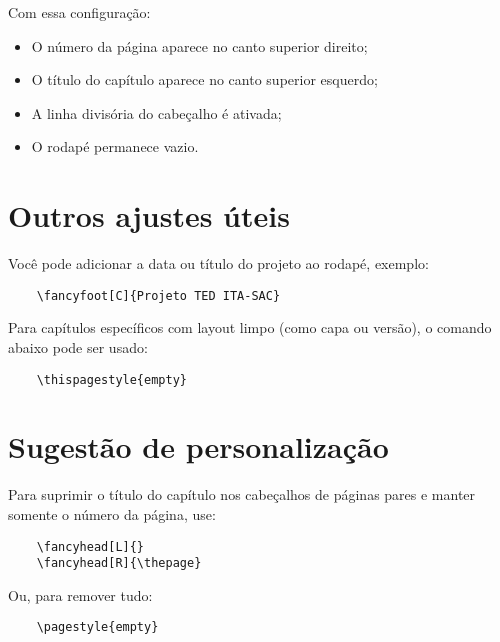 Com essa configuração:

\begin{itemize}
	\item O número da página aparece no canto superior direito;
	\item O título do capítulo aparece no canto superior esquerdo;
	\item A linha divisória do cabeçalho é ativada;
	\item O rodapé permanece vazio.
\end{itemize}

\section{Outros ajustes úteis}

Você pode adicionar a data ou título do projeto ao rodapé, exemplo:

\begin{verbatim}
	\fancyfoot[C]{Projeto TED ITA-SAC}
\end{verbatim}

Para capítulos específicos com layout limpo (como capa ou versão), o comando abaixo pode ser usado:

\begin{verbatim}
	\thispagestyle{empty}
\end{verbatim}

\section{Sugestão de personalização}

Para suprimir o título do capítulo nos cabeçalhos de páginas pares e manter somente o número da página, use:

\begin{verbatim}
	\fancyhead[L]{}
	\fancyhead[R]{\thepage}
\end{verbatim}

Ou, para remover tudo:

\begin{verbatim}
	\pagestyle{empty}
\end{verbatim}

